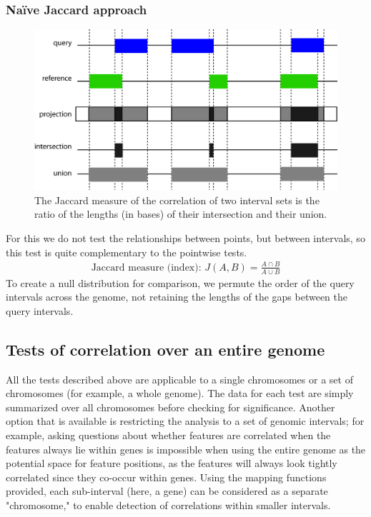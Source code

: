 \documentclass{article}
\begin{document}
\subsubsection{Na\"{i}ve Jaccard approach}
\begin{figure}[h!]
	\centering\includegraphics[scale=\picscale]{png/fig10}
	\caption{The Jaccard measure of the correlation of two interval sets is the ratio of the lengths (in bases) of their intersection and their union.}
\end{figure}
For this we do not test the relationships between points, but between intervals, so this test is quite complementary to the pointwise tests.
\begin{align*}
\mbox{Jaccard measure (index):\ \ } J(A,B)=\displaystyle \frac {A \cap B}{A \cup B}
\end{align*}
To create a null distribution for comparison, we permute the order of the query intervals across the genome, not retaining the lengths of the gaps between the query intervals.


\subsection{Tests of correlation over an entire genome}

All the tests described above are applicable to a single chromosomes or a set of chromosomes (for example, a whole genome). The data for each test are simply summarized over all chromosomes before checking for significance. Another option that is available is restricting the analysis to a set of genomic intervals; for example, asking questions about whether features are correlated when the features always lie within genes is impossible when using the entire genome as the potential space for feature positions, as the features will always look tightly correlated since they co-occur within genes. Using the mapping functions provided, each sub-interval (here, a gene) can be considered as a separate "chromosome," to enable detection of correlations within smaller intervals.
\end{document}
